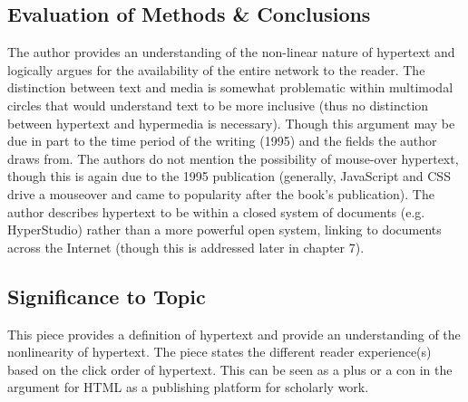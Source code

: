 \documentclass[leavefloats]{apa6e}\usepackage[]{graphicx}\usepackage[]{color}
\begin{document}
\subsection{Evaluation of Methods \& Conclusions} %
The author provides an understanding of the non-linear nature of hypertext and logically argues for the availability of the entire network to the reader.  The distinction between text and media is somewhat problematic within multimodal circles that would understand text to be more inclusive (thus no distinction between hypertext and hypermedia is necessary).  Though this argument may be due in part to the time period of the writing (1995) and the fields the author draws from.  The authors do not mention the possibility of mouse-over hypertext, though this is again due to the 1995 publication (generally, JavaScript and CSS drive a mouseover and came to popularity after the book's publication).  The author describes hypertext to be within a closed system of documents (e.g. HyperStudio) rather than a more powerful open system, linking to documents across the Internet (though this is addressed later in chapter 7).

\subsection{Significance to Topic} %
This piece provides a definition of hypertext and provide an understanding of the nonlinearity of hypertext.  The piece states the different reader experience(s) based on the click order of hypertext.  This can be seen as a plus or a con in the argument for HTML as a publishing platform for scholarly work.


 \section{\textcite{Nielsen1995b}}





\regpar
\end{document}
